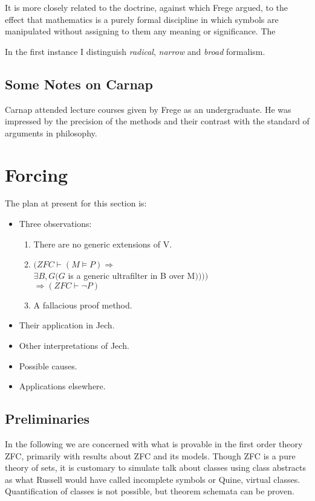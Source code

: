 \documentclass[10pt,titlepage]{article}
\begin{document}
It is more closely related to the doctrine, against which Frege argued, to the effect that mathematics is a purely formal discipline in which symbols are manipulated without assigning to them any meaning or significance.
The

In the first instance I distinguish \emph{radical}, \emph{narrow} and \emph{broad} formalism. 

\subsection{Some Notes on Carnap}

Carnap attended lecture courses given by Frege as an undergraduate.
He was impressed by the precision of the methods and their contrast with the standard of arguments in philosophy.

\section{Forcing}

The plan at present for this section is:

\begin{itemize}
\item Three observations:

\begin{enumerate}
\item There are no generic extensions of V. 
\item $(ZFC \vdash (M \models P) \Rightarrow$\\
  $\exists B, G (G$ is a generic ultrafilter in B over M$))))$\\
  $\Rightarrow (ZFC \vdash \lnot P)$
\item A fallacious proof method.
\end{enumerate}

\item Their application in Jech.
\item Other interpretations of Jech.
\item Possible causes.
\item Applications elsewhere.
\end{itemize}

\subsection{Preliminaries}

In the following we are concerned with what is provable in the first order theory ZFC, primarily with results about ZFC and its models.
Though ZFC is a pure theory of sets, it is customary to simulate talk about classes using class abstracts as what Russell would have called incomplete symbols or Quine, virtual classes. 
Quantification of classes is not possible, but theorem schemata can be proven.
\end{document}
